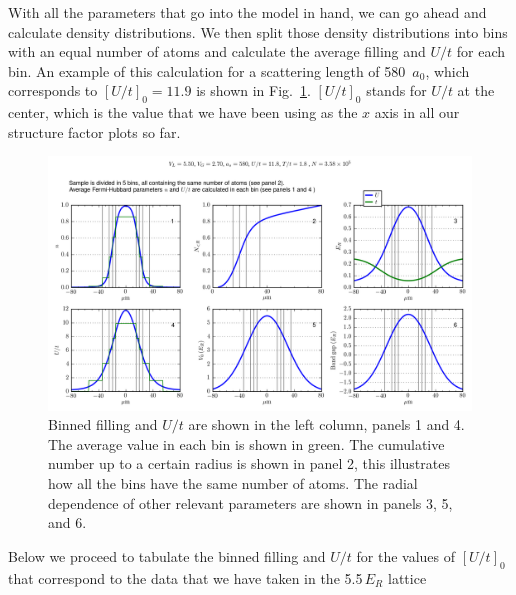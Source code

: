 \documentclass[11pt,letter]{article}
\begin{document}
With all the parameters that go into the model in hand, we can go ahead and
calculate density distributions.  We then split those density distributions
into bins with an equal number of atoms and calculate the average filling and
$U/t$ for each bin.   An example of this calculation for a scattering length of
580~$a_{0}$, which corresponds to $[U/t]_{0}=11.9$ is shown in
Fig.~\ref{fig:bin-580a0}.  $[U/t]_{0}$ stands for $U/t$ at the center, which is
the value that we have been using as the $x$ axis in all our structure factor
plots so far. 
\begin{figure}
\centering
\includegraphics[width=\textwidth]{figures_140129/bin_5p5Er_2p7Gr580a0.png}
\caption[Binned density distribution]{\small Binned filling and $U/t$ are shown
in the left column, panels 1 and 4. The average value in each bin is shown in
green. The cumulative number up to a certain radius is shown in panel 2,  this
illustrates how all the bins have the same number of atoms.  The radial
dependence of other relevant parameters are shown in panels 3, 5, and 6. }
\label{fig:bin-580a0} 
\end{figure} 

Below we proceed to tabulate the binned filling and $U/t$ for the values of 
$[U/t]_{0}$ that correspond to the data that we have taken in the 5.5\,$E_{R}$ lattice
\vspace{1em}
\end{document}
